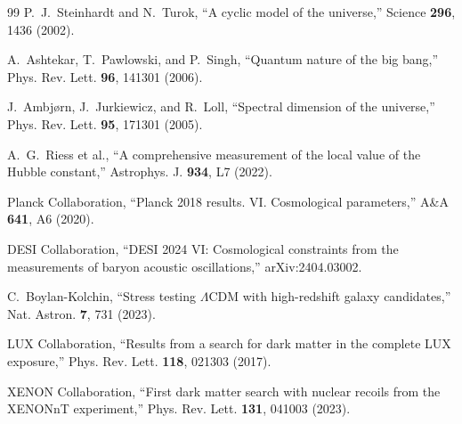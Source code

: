 \documentclass[11pt,a4paper]{article}
\begin{document}
\begin{thebibliography}{99}
 P.~J.~Steinhardt and N.~Turok, ``A cyclic model of the universe,'' Science \textbf{296}, 1436 (2002).

 A.~Ashtekar, T.~Pawlowski, and P.~Singh, ``Quantum nature of the big bang,'' Phys. Rev. Lett. \textbf{96}, 141301 (2006).

 J.~Ambj{\o}rn, J.~Jurkiewicz, and R.~Loll, ``Spectral dimension of the universe,'' Phys. Rev. Lett. \textbf{95}, 171301 (2005).

 A.~G.~Riess et al., ``A comprehensive measurement of the local value of the Hubble constant,'' Astrophys. J. \textbf{934}, L7 (2022).

 Planck Collaboration, ``Planck 2018 results. VI. Cosmological parameters,'' A\&A \textbf{641}, A6 (2020).

 DESI Collaboration, ``DESI 2024 VI: Cosmological constraints from the measurements of baryon acoustic oscillations,'' arXiv:2404.03002.

 C.~Boylan-Kolchin, ``Stress testing $\Lambda$CDM with high-redshift galaxy candidates,'' Nat. Astron. \textbf{7}, 731 (2023).

 LUX Collaboration, ``Results from a search for dark matter in the complete LUX exposure,'' Phys. Rev. Lett. \textbf{118}, 021303 (2017).

 XENON Collaboration, ``First dark matter search with nuclear recoils from the XENONnT experiment,'' Phys. Rev. Lett. \textbf{131}, 041003 (2023).

\end{thebibliography}
\end{document}
